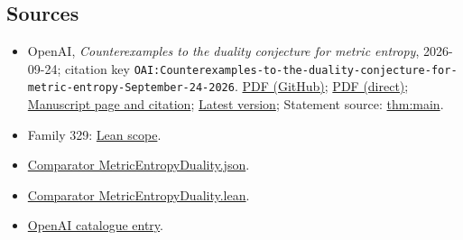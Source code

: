 \documentclass[11pt]{article}
\begin{document}
\subsection{Sources}
\begin{itemize}
\item OpenAI, \emph{Counterexamples to the duality conjecture for metric entropy}, 2026-09-24; citation key \texttt{OAI:Counterexamples-to-the-duality-conjecture-for-metric-entropy-September-24-2026}. \href{https://github.com/openai/math/blob/adc7f1241b42e322a6451854ab7e4b4c146bf78a/preprints/Counterexamples-to-the-duality-conjecture-for-metric-entropy-September-24-2026/main.pdf}{PDF (GitHub)}; \href{https://github.com/openai/math/raw/adc7f1241b42e322a6451854ab7e4b4c146bf78a/preprints/Counterexamples-to-the-duality-conjecture-for-metric-entropy-September-24-2026/main.pdf}{PDF (direct)}; \href{https://github.com/openai/math/blob/adc7f1241b42e322a6451854ab7e4b4c146bf78a/preprints/Counterexamples-to-the-duality-conjecture-for-metric-entropy-September-24-2026/README.md}{Manuscript page and citation}; \href{https://github.com/openai/math/blob/main/preprints/Counterexamples-to-the-duality-conjecture-for-metric-entropy-September-24-2026/main.pdf}{Latest version}; Statement source: \href{https://github.com/openai/math/blob/adc7f1241b42e322a6451854ab7e4b4c146bf78a/preprints/Counterexamples-to-the-duality-conjecture-for-metric-entropy-September-24-2026/build/sections/01-introduction.tex\#L30}{thm:main}.
\item Family 329: \href{https://github.com/openai/math/blob/adc7f1241b42e322a6451854ab7e4b4c146bf78a/lean/docs/329.md}{Lean scope}.
\item \href{https://github.com/openai/math/blob/adc7f1241b42e322a6451854ab7e4b4c146bf78a/lean/ComparatorChallenges/MetricEntropyDuality.json}{Comparator MetricEntropyDuality.json}.
\item \href{https://github.com/openai/math/blob/adc7f1241b42e322a6451854ab7e4b4c146bf78a/lean/ComparatorChallenges/MetricEntropyDuality.lean}{Comparator MetricEntropyDuality.lean}.
\item \href{https://github.com/openai/math/blob/adc7f1241b42e322a6451854ab7e4b4c146bf78a/CONTENTS.md}{OpenAI catalogue entry}.
\end{itemize}
\end{document}
